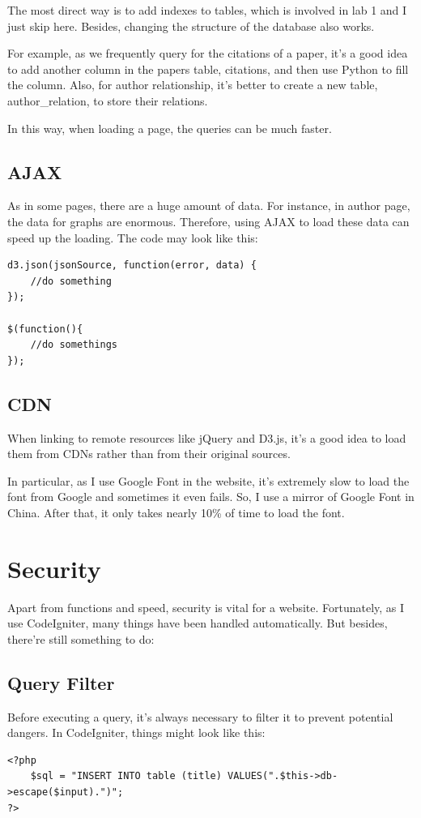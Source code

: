 \documentclass[a4paper]{article}
\begin{document}
The most direct way is to add indexes to tables, which is involved in lab 1 and I just skip here. Besides,
changing the structure of the database also works.

For example, as we frequently query for the citations of a paper, it's a good idea to add another column in the
papers table, citations, and then use Python to fill the column. Also, for author relationship, it's better
to create a new table, author\_relation, to store their relations.

In this way, when loading a page, the queries can be much faster.
        \subsection{AJAX}
As in some pages, there are a huge amount of data. For instance, in author page, the data for graphs are enormous.
Therefore, using AJAX to load these data can speed up the loading. The code may look like this:
\begin{verbatim}
d3.json(jsonSource, function(error, data) {
    //do something
});

$(function(){
    //do somethings             
});
\end{verbatim} 
        \subsection{CDN}
When linking to remote resources like jQuery and D3.js, it’s a good idea to load them from CDNs rather than 
from their original sources. 

In particular, as I use Google Font in the website, it’s extremely slow to load the font from Google and 
sometimes it even fails. So, I use a mirror of Google Font in China. After that, it only takes nearly 10\% 
of time to load the font.
    \newpage
    \section{Security}
Apart from functions and speed, security is vital for a website. Fortunately, as I use CodeIgniter, many things
have been handled automatically. But besides, there're still something to do:
        \subsection{Query Filter}
Before executing a query, it's always necessary to filter it to prevent potential dangers. In CodeIgniter, things
might look like this:
\begin{verbatim}
<?php
    $sql = "INSERT INTO table (title) VALUES(".$this->db->escape($input).")";
?>
\end{verbatim}
\end{document}
